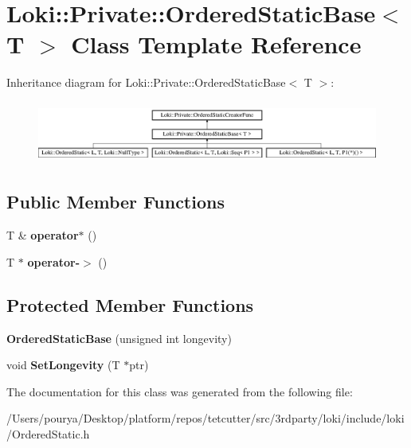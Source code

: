 \hypertarget{classLoki_1_1Private_1_1OrderedStaticBase}{}\section{Loki\+:\+:Private\+:\+:Ordered\+Static\+Base$<$ T $>$ Class Template Reference}
\label{classLoki_1_1Private_1_1OrderedStaticBase}
Inheritance diagram for Loki\+:\+:Private\+:\+:Ordered\+Static\+Base$<$ T $>$\+:\begin{figure}[H]
\begin{center}
\leavevmode
\includegraphics[height=2.051282cm]{classLoki_1_1Private_1_1OrderedStaticBase}
\end{center}
\end{figure}
\subsection*{Public Member Functions}
\begin{DoxyCompactItemize}
\item 
\hypertarget{classLoki_1_1Private_1_1OrderedStaticBase_a80873cabe1962fe4f6b505ba22a37b8a}{}T \& {\bfseries operator$\ast$} ()\label{classLoki_1_1Private_1_1OrderedStaticBase_a80873cabe1962fe4f6b505ba22a37b8a}

\item 
\hypertarget{classLoki_1_1Private_1_1OrderedStaticBase_a773b016878c5e76ea86068799d817b0c}{}T $\ast$ {\bfseries operator-\/$>$} ()\label{classLoki_1_1Private_1_1OrderedStaticBase_a773b016878c5e76ea86068799d817b0c}

\end{DoxyCompactItemize}
\subsection*{Protected Member Functions}
\begin{DoxyCompactItemize}
\item 
\hypertarget{classLoki_1_1Private_1_1OrderedStaticBase_ac924c67432d209d8783a772dae447efe}{}{\bfseries Ordered\+Static\+Base} (unsigned int longevity)\label{classLoki_1_1Private_1_1OrderedStaticBase_ac924c67432d209d8783a772dae447efe}

\item 
\hypertarget{classLoki_1_1Private_1_1OrderedStaticBase_af0e67fc2cb06ed998ce9b0fba2b1a5b3}{}void {\bfseries Set\+Longevity} (T $\ast$ptr)\label{classLoki_1_1Private_1_1OrderedStaticBase_af0e67fc2cb06ed998ce9b0fba2b1a5b3}

\end{DoxyCompactItemize}


The documentation for this class was generated from the following file\+:\begin{DoxyCompactItemize}
\item 
/\+Users/pourya/\+Desktop/platform/repos/tetcutter/src/3rdparty/loki/include/loki/Ordered\+Static.\+h\end{DoxyCompactItemize}
